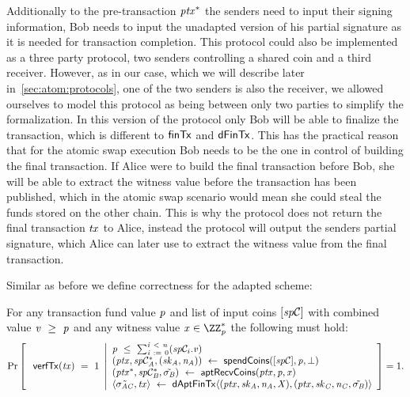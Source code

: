 \begin{definition}
\begin{itemize}
        Additionally to the pre-transaction $\mathit{ptx}^*$ the senders need to input their signing information, Bob needs to input the unadapted version of his partial signature as it is needed for transaction completion.
        This protocol could also be implemented as a three party protocol, two senders controlling a shared coin and a third receiver.
        However, as in our case, which we will describe later in~\cref{sec:atom:protocols}, one of the two senders is also the receiver, we allowed ourselves to model this protocol as being between only two parties to simplify the formalization.
        In this version of the protocol only Bob will be able to finalize the transaction, which is different to $\mathsf{finTx}$ and $\mathsf{dFinTx}$.
        This has the practical reason that for the atomic swap execution Bob needs to be the one in control of building the final transaction.
        If Alice were to build the final transaction before Bob, she will be able to extract the witness value before the transaction has been published, which in the atomic swap scenario would mean she could steal the funds stored on the other chain.
        This is why the protocol does not return the final transaction $\mathit{tx}$ to Alice, instead the protocol will output the senders partial signature, which Alice can later use to extract the witness value from the final transaction.
    \end{itemize}
\end{definition}

Similar as before we define correctness for the adapted scheme:

\begin{definition}
    \label{def:atom:apt-tx-scheme-correctness}
    For any transaction fund value $\mathit{p}$ and list of input coins $[\mathit{sp}\mathcal{C}]$ with combined value $\mathit{v} ~\geq~ \mathit{p}$ and any witness value $\varX \opIn \cnstIntegersPrimeWithoutZero{\varPrime}$ the following must hold:
    \[
        \Pr\left[
        \begin{array}{c}
            \: \mathsf{verfTx}(\mathit{tx}) ~=~ 1
        \end{array}
        \middle\vert
        \begin{array}{l}
            \mathit{p} ~\leq~ \sum_{\mathit{i} ~:=~ 0}^{\mathit{i} ~<~ \mathit{n}}(\mathit{sp}\mathcal{C}_{i}.\mathit{v}) \\
            (\mathit{ptx}, \mathit{sp}\mathcal{C}_{\mathit{A}}^*, (\mathit{sk}_{\mathit{A}}, \mathit{\mathit{n}_{\mathit{A}}})) ~\leftarrow~ \mathsf{spendCoins}([\mathit{sp}\mathcal{C}],\mathit{p},\bot) \\
            (\mathit{ptx}^*, \mathit{sp}\mathcal{C}_{\mathit{B}}^*, \tilde{\sigma_{\mathit{B}}}) ~\leftarrow~ \mathsf{aptRecvCoins}(\mathit{ptx},\mathit{p},\mathit{x}) \\
            \langle \tilde{\sigma_{\mathit{A}\mathit{C}}}, \mathit{tx} \rangle ~\leftarrow~ \mathsf{dAptFinTx} \langle (\mathit{ptx},\mathit{sk}_{\mathit{A}},\mathit{\mathit{n}_{\mathit{A}}},\mathit{X}), (\mathit{ptx},\mathit{sk}_{\mathit{C}},\mathit{\mathit{n}_{\mathit{C}}},\tilde{\sigma_{\mathit{B}}}) \rangle
        \end{array}
        \right]=1.
    \]
\end{definition}
